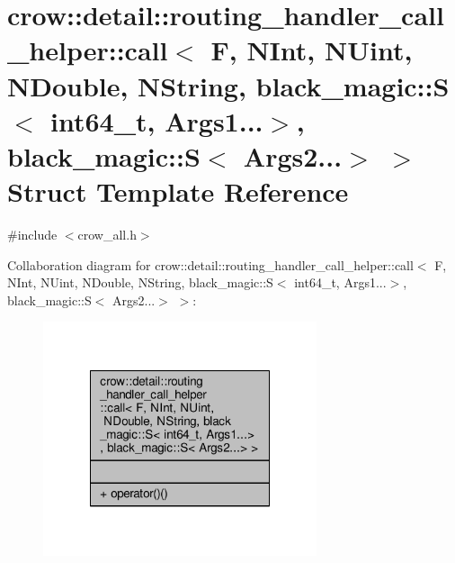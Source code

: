 \hypertarget{structcrow_1_1detail_1_1routing__handler__call__helper_1_1call_3_01_f_00_01_n_int_00_01_n_uint_0b6a35a476dfcab9d942547331be456a9}{\section{crow\-:\-:detail\-:\-:routing\-\_\-handler\-\_\-call\-\_\-helper\-:\-:call$<$ F, N\-Int, N\-Uint, N\-Double, N\-String, black\-\_\-magic\-:\-:S$<$ int64\-\_\-t, Args1...$>$, black\-\_\-magic\-:\-:S$<$ Args2...$>$ $>$ Struct Template Reference}
\label{structcrow_1_1detail_1_1routing__handler__call__helper_1_1call_3_01_f_00_01_n_int_00_01_n_uint_0b6a35a476dfcab9d942547331be456a9}
}


{\ttfamily \#include $<$crow\-\_\-all.\-h$>$}



Collaboration diagram for crow\-:\-:detail\-:\-:routing\-\_\-handler\-\_\-call\-\_\-helper\-:\-:call$<$ F, N\-Int, N\-Uint, N\-Double, N\-String, black\-\_\-magic\-:\-:S$<$ int64\-\_\-t, Args1...$>$, black\-\_\-magic\-:\-:S$<$ Args2...$>$ $>$\-:
\nopagebreak
\begin{figure}[H]
\begin{center}
\leavevmode
\includegraphics[width=228pt]{structcrow_1_1detail_1_1routing__handler__call__helper_1_1call_3_01_f_00_01_n_int_00_01_n_uint_02f2ef9f2caa4ce02988e16efe389cfa0}
\end{center}
\end{figure}
